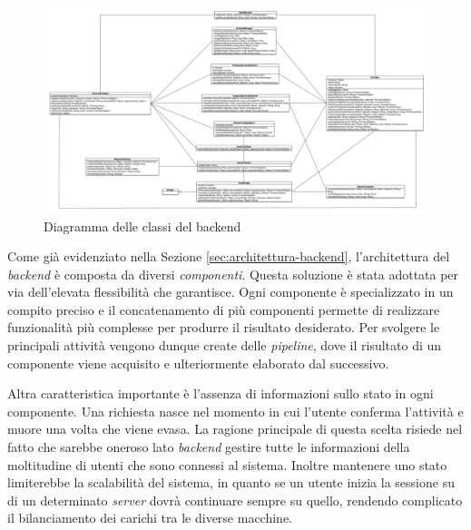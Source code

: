 \begin{figure}[p]
	\centering
	\includegraphics[height=\textwidth, width=\textheight, angle=90]{5-implementazione-backend/Immagini/diagramma_classi_backend.png}
	\caption{Diagramma delle classi del backend}\label{fig:class-diagram-backend}
\end{figure}

Come già evidenziato nella Sezione \ref{sec:architettura-backend}, l'architettura del \emph{backend} è composta da diversi \emph{componenti}. Questa soluzione è stata adottata per via dell'elevata flessibilità che garantisce. Ogni componente è specializzato in un compito preciso e il concatenamento di più componenti permette di realizzare funzionalità più complesse per produrre il risultato desiderato. Per svolgere le principali attività vengono dunque create delle \emph{pipeline}, dove il risultato di un componente viene acquisito e ulteriormente elaborato dal successivo.

Altra caratteristica importante è l'assenza di informazioni sullo stato in ogni componente. Una richiesta nasce nel momento in cui l'utente conferma l'attività e muore una volta che viene evasa. La ragione principale di questa scelta risiede nel fatto che sarebbe oneroso lato \emph{backend} gestire tutte le informazioni della moltitudine di utenti che sono connessi al sistema. Inoltre mantenere uno stato limiterebbe la scalabilità del sistema, in quanto se un utente inizia la sessione su di un determinato \emph{server} dovrà continuare sempre su quello, rendendo complicato il bilanciamento dei carichi tra le diverse macchine.

